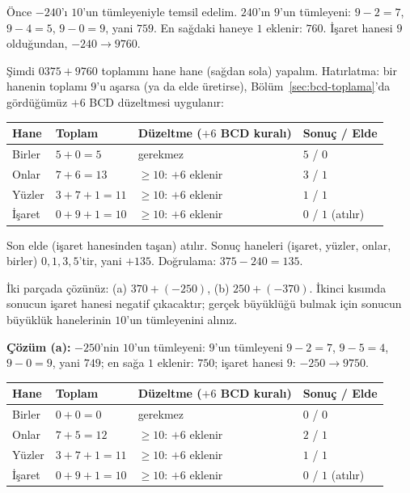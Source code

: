 \begin{ornek}[$(+375)+(-240)$]
Önce $-240$'ı $10$'un tümleyeniyle temsil edelim. $240$'ın $9$'un tümleyeni: $9-2=7$,
$9-4=5$, $9-0=9$, yani $759$. En sağdaki haneye $1$ eklenir: $760$. İşaret hanesi $9$
olduğundan, $-240\to9760$.

Şimdi $0375+9760$ toplamını hane hane (sağdan sola) yapalım. Hatırlatma: bir hanenin
toplamı $9$'u aşarsa (ya da elde üretirse), Bölüm~\ref{sec:bcd-toplama}'da gördüğümüz
$+6$ BCD düzeltmesi uygulanır:

\begin{center}
\small
\begin{tabular}{@{}lp{3.6cm}p{2.6cm}p{2.8cm}@{}}
\toprule
Hane & Toplam & Düzeltme ($+6$ BCD kuralı) & Sonuç / Elde \\
\midrule
Birler & $5+0=5$ & gerekmez & $5$ / $0$ \\
Onlar & $7+6=13$ & $\ge10$: $+6$ eklenir & $3$ / $1$ \\
Yüzler & $3+7+1=11$ & $\ge10$: $+6$ eklenir & $1$ / $1$ \\
İşaret & $0+9+1=10$ & $\ge10$: $+6$ eklenir & $0$ / $1$ (atılır) \\
\bottomrule
\end{tabular}
\end{center}

Son elde (işaret hanesinden taşan) atılır. Sonuç haneleri (işaret, yüzler, onlar, birler)
$0,1,3,5$'tir, yani $+135$. Doğrulama: $375-240=135$.
\end{ornek}

\begin{alistirma}[\orta]
İki parçada çözünüz: (a) $370+(-250)$, (b) $250+(-370)$. İkinci kısımda sonucun işaret
hanesi negatif çıkacaktır; gerçek büyüklüğü bulmak için sonucun büyüklük hanelerinin
$10$'un tümleyenini alınız.
\end{alistirma}

\noindent\textbf{Çözüm (a):} $-250$'nin $10$'un tümleyeni: $9$'un tümleyeni $9-2=7$,
$9-5=4$, $9-0=9$, yani $749$; en sağa $1$ eklenir: $750$; işaret hanesi $9$: $-250\to9750$.

\begin{center}
\small
\begin{tabular}{@{}lp{3.6cm}p{2.6cm}p{2.8cm}@{}}
\toprule
Hane & Toplam & Düzeltme ($+6$ BCD kuralı) & Sonuç / Elde \\
\midrule
Birler & $0+0=0$ & gerekmez & $0$ / $0$ \\
Onlar & $7+5=12$ & $\ge10$: $+6$ eklenir & $2$ / $1$ \\
Yüzler & $3+7+1=11$ & $\ge10$: $+6$ eklenir & $1$ / $1$ \\
İşaret & $0+9+1=10$ & $\ge10$: $+6$ eklenir & $0$ / $1$ (atılır) \\
\bottomrule
\end{tabular}
\end{center}

